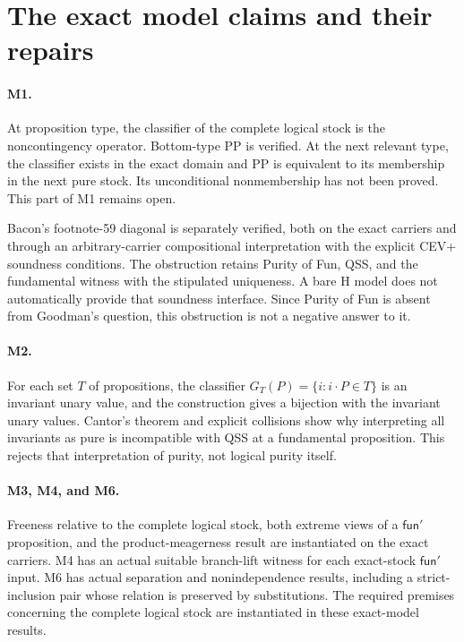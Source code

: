 \documentclass[12pt,leqno]{article}
\newcommand{\funp}{\mathsf{fun}'}
\begin{document}
\section{The exact model claims and their repairs}

\paragraph{M1.}
At proposition type, the classifier of the complete logical stock is
the noncontingency operator. Bottom-type PP is verified. At the next
relevant type, the classifier exists in the exact domain and PP is
equivalent to its membership in the next pure stock. Its unconditional
nonmembership has not been proved. This part of M1 remains open.

Bacon's footnote-59 diagonal is separately verified, both on the exact
carriers and through an arbitrary-carrier compositional interpretation
with the explicit CEV+ soundness conditions. The obstruction retains
Purity of Fun, QSS, and the fundamental witness with the stipulated
uniqueness. A bare H model does not automatically provide that soundness
interface. Since Purity of Fun is absent from Goodman's question, this
obstruction is not a negative answer to it.

\paragraph{M2.}
For each set $T$ of propositions, the classifier
$G_T(P)=\{i:i\cdot P\in T\}$ is an invariant unary value, and the
construction gives a bijection with the invariant unary values. Cantor's
theorem and explicit collisions show why interpreting all invariants as
pure is incompatible with QSS at a fundamental proposition. This rejects
that interpretation of purity, not logical purity itself.

\paragraph{M3, M4, and M6.}
Freeness relative to the complete logical stock, both extreme views of a
$\funp$ proposition, and the product-meagerness result are instantiated
on the exact carriers. M4 has an actual suitable branch-lift witness
for each exact-stock $\funp$ input. M6 has actual separation and
nonindependence results, including a strict-inclusion pair whose relation
is preserved by substitutions. The required premises concerning the
complete logical stock are instantiated in these exact-model results.
\end{document}
